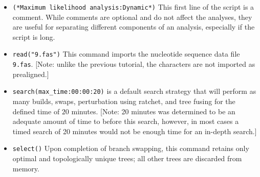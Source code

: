 \begin{itemize}
\item \texttt{(*Maximum likelihood analysis:Dynamic*)} This first
line of the script is a comment.  While comments are optional and
do not affect the analyses, they are useful for separating different
components of an analysis, especially if the script is long.  
\item \texttt{read("9.fas")} This command imports the nucleotide sequence
data file \texttt{9.fas}.  [Note: unlike the previous tutorial, the
characters are not imported as prealigned.] 
\item \texttt{search(max\_time:00:00:20)}  is a default
search strategy that will perform as many builds, swaps, perturbation
using ratchet, and tree fusing for the defined time of $ 20 $
minutes.  [Note: 20 minutes was determined to be an adequate amount
of time to before this search, however, in most cases a timed search
of 20 minutes would not be enough time for an in-depth search.]
\item \texttt{select()} Upon completion of branch swapping, this
command retains only optimal and topologically unique trees; all
other trees are discarded from memory.


\end{itemize}
